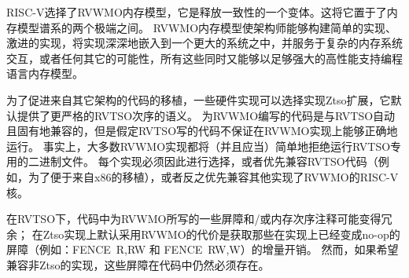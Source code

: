 RISC-V选择了RVWMO内存模型，它是释放一致性的一个变体。这将它置于了内存模型谱系的两个极端之间。
RVWMO内存模型使架构师能够构建简单的实现、激进的实现，将实现深深地嵌入到一个更大的系统之中，并服务于复杂的内存系统交互，或者任何其它的可能性，所有这些同时又能够以足够强大的高性能支持编程语言内存模型。

为了促进来自其它架构的代码的移植，一些硬件实现可以选择实现Ztso扩展，它默认提供了更严格的RVTSO次序的语义。
为RVWMO编写的代码是与RVTSO自动且固有地兼容的，但是假定RVTSO写的代码不保证在RVWMO实现上能够正确地运行。
事实上，大多数RVWMO实现都将（并且应当）简单地拒绝运行RVTSO专用的二进制文件。
每个实现必须因此进行选择，或者优先兼容RVTSO代码（例如，为了便于来自x86的移植），或者反之优先兼容其他实现了RVWMO的RISC-V核。

在RVTSO下，代码中为RVWMO所写的一些屏障和/或内存次序注释可能变得冗余；
在Ztso实现上默认采用RVWMO的代价是获取那些在实现上已经变成no-op的屏障（例如：FENCE~R,RW 和 FENCE~RW,W）的增量开销。
然而，如果希望兼容非Ztso的实现，这些屏障在代码中仍然必须存在。

